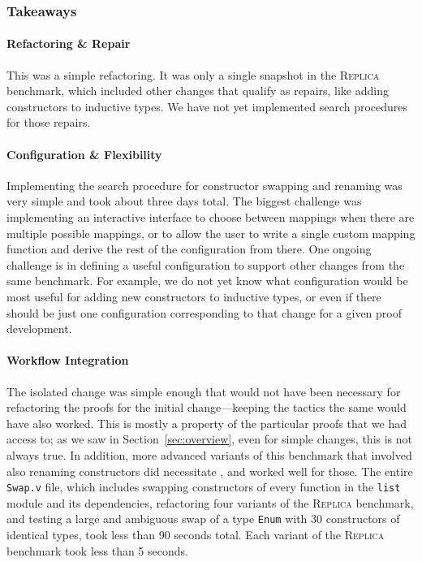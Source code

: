 \subsubsection{Takeaways}

\paragraph{Refactoring \& Repair}
This was a simple refactoring.
It was only a single snapshot in the \textsc{Replica} benchmark, which included
other changes that qualify as repairs, like adding constructors to inductive types.
We have not yet implemented search procedures for those repairs.

\paragraph{Configuration \& Flexibility}
Implementing the search procedure for constructor swapping and renaming was very simple and took about three days total.
The biggest challenge was implementing an interactive interface to choose between mappings when there are multiple possible mappings,
or to allow the user to write a single custom mapping function and derive the rest of the configuration from there.
One ongoing challenge is in defining a useful configuration to support other changes from the same benchmark.
For example, we do not yet know what configuration would be most useful for adding new constructors to inductive types,
or even if there should be just one configuration corresponding to that change for a given proof development.

\paragraph{Workflow Integration}
The isolated change was simple enough that \toolname would not have been necessary
for refactoring the proofs for the initial change---keeping the tactics the same would have also worked.
This is mostly a property of the particular proofs that we had access to;
as we saw in Section~\ref{sec:overview}, even for simple changes, this is not always true.
In addition, more advanced variants of this benchmark that involved also renaming constructors did necessitate \toolname,
and \toolname worked well for those. %
The entire \lstinline{Swap.v} file, which includes swapping constructors of every function in the \lstinline{list} module and
its dependencies, refactoring four variants of the \textsc{Replica} benchmark,
and testing a large and ambiguous swap of a type \lstinline{Enum} with 30 constructors of identical types,
took \toolname less than 90 seconds total. %
Each variant of the \textsc{Replica} benchmark took \toolname less than 5 seconds. %

